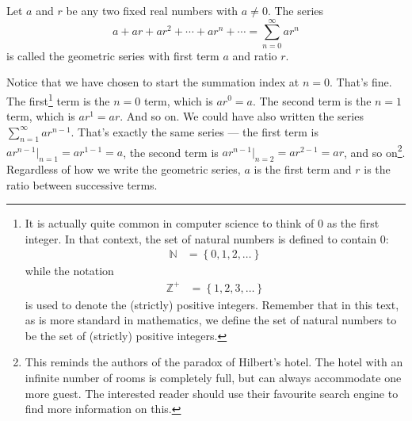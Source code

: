 \goodbreak
\begin{eg}\label{eg:SRgeom}
Let $a$ and $r$ be any two fixed real numbers with $a\ne 0$.
The series
\begin{equation*}
a + ar + ar^2 + \cdots + ar^n + \cdots = \sum_{n=0}^\infty ar^n
\end{equation*}
is called the geometric series with first term $a$ and ratio $r$.

Notice that we have chosen to start the summation index at $n=0$.
That's fine. The first\footnote{It is actually quite common in computer
science to think of $0$ as the first integer. In that context, the set of natural numbers is defined to contain $0$:
\begin{align*}
  \mathbb{N} &= \left\{0,1,2,\dots \right\}
\end{align*}
while the notation
\begin{align*}
  \mathbb{Z}^+ &= \left\{1,2,3,\dots \right\}
\end{align*}
is used to denote the (strictly) positive integers. Remember that in
this text, as is more standard in mathematics, we
define the set of natural numbers to be the set of (strictly)
positive integers.} term is the $n=0$ term, which is $ar^0=a$. The
second term is the $n=1$ term, which is $ar^1=ar$. And so on.
We could have also written the series $\sum_{n=1}^\infty ar^{n-1}$. That's exactly the same series --- the first term is
$ar^{n-1}\big|_{n=1}=ar^{1-1}=a$, the second term is $ar^{n-1}\big|_{n=2}=ar^{2-1}=ar$, and so on\footnote{This
reminds the authors of the paradox of Hilbert's hotel. The hotel
with an infinite number of rooms is completely full, but can always
accommodate one more guest. The interested reader should use their
favourite search engine to find more information on this.}. Regardless of
how we write the geometric series, $a$ is the first term and $r$ is the
ratio between successive terms.



\end{eg}
